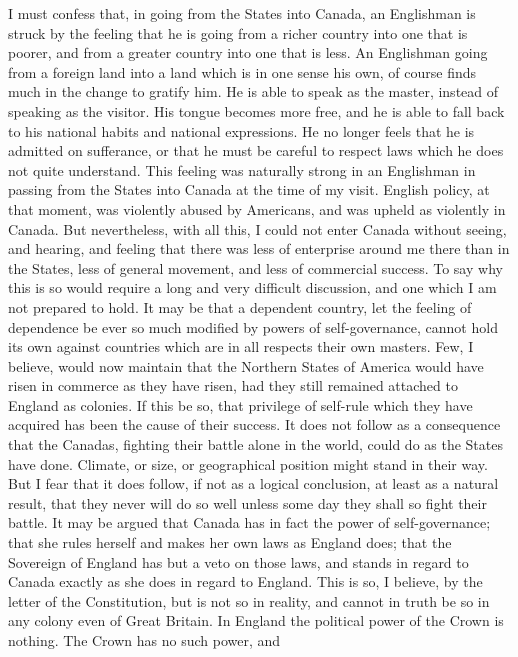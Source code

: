 I must confess that, in going from the States into Canada, an
Englishman is struck by the feeling that he is going from a richer
country into one that is poorer, and from a greater country into
one that is less.  An Englishman going from a foreign land into a
land which is in one sense his own, of course finds much in the
change to gratify him.  He is able to speak as the master, instead
of speaking as the visitor.  His tongue becomes more free, and he
is able to fall back to his national habits and national
expressions.  He no longer feels that he is admitted on sufferance,
or that he must be careful to respect laws which he does not quite
understand.  This feeling was naturally strong in an Englishman in
passing from the States into Canada at the time of my visit.
English policy, at that moment, was violently abused by Americans,
and was upheld as violently in Canada.  But nevertheless, with all
this, I could not enter Canada without seeing, and hearing, and
feeling that there was less of enterprise around me there than in
the States, less of general movement, and less of commercial
success.  To say why this is so would require a long and very
difficult discussion, and one which I am not prepared to hold.  It
may be that a dependent country, let the feeling of dependence be
ever so much modified by powers of self-governance, cannot hold its
own against countries which are in all respects their own masters.
Few, I believe, would now maintain that the Northern States of
America would have risen in commerce as they have risen, had they
still remained attached to England as colonies.  If this be so,
that privilege of self-rule which they have acquired has been the
cause of their success.  It does not follow as a consequence that
the Canadas, fighting their battle alone in the world, could do as
the States have done.  Climate, or size, or geographical position
might stand in their way.  But I fear that it does follow, if not
as a logical conclusion, at least as a natural result, that they
never will do so well unless some day they shall so fight their
battle.  It may be argued that Canada has in fact the power of
self-governance; that she rules herself and makes her own laws as
England does; that the Sovereign of England has but a veto on those
laws, and stands in regard to Canada exactly as she does in regard
to England.  This is so, I believe, by the letter of the
Constitution, but is not so in reality, and cannot in truth be so
in any colony even of Great Britain.  In England the political
power of the Crown is nothing.  The Crown has no such power, and
